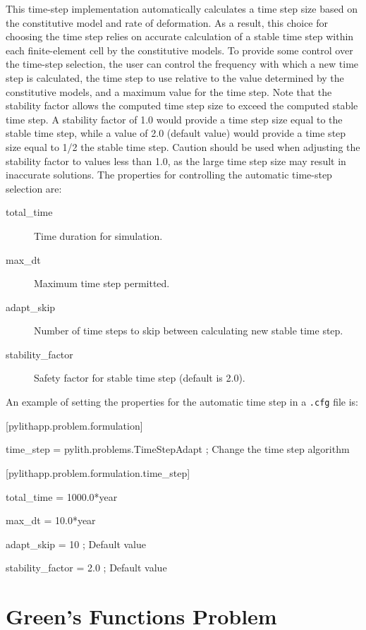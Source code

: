 This time-step implementation automatically calculates a time step
size based on the constitutive model and rate of deformation. As a
result, this choice for choosing the time step relies on accurate
calculation of a stable time step within each finite-element cell
by the constitutive models. To provide some control over the time-step
selection, the user can control the frequency with which a new time
step is calculated, the time step to use relative to the value determined
by the constitutive models, and a maximum value for the time step.
Note that the stability factor allows the computed time step size
to exceed the computed stable time step. A stability factor of 1.0
would provide a time step size equal to the stable time step, while
a value of 2.0 (default value) would provide a time step size equal
to 1/2 the stable time step. Caution should be used when adjusting
the stability factor to values less than 1.0, as the large time step
size may result in inaccurate solutions. The properties for controlling
the automatic time-step selection are:
\begin{description}
\item [{total\_time}] Time duration for simulation.
\item [{max\_dt}] Maximum time step permitted.
\item [{adapt\_skip}] Number of time steps to skip between calculating
new stable time step.
\item [{stability\_factor}] Safety factor for stable time step (default
is 2.0).
\end{description}
An example of setting the properties for the automatic time step in
a \texttt{.cfg} file is:
\begin{lyxcode}
{[}pylithapp.problem.formulation{]}

time\_step = pylith.problems.TimeStepAdapt ; Change the time step algorithm



{[}pylithapp.problem.formulation.time\_step{]}

total\_time = 1000.0{*}year

max\_dt = 10.0{*}year

adapt\_skip = 10 ; Default value

stability\_factor = 2.0 ; Default value
\end{lyxcode}

\section{Green's Functions Problem}

